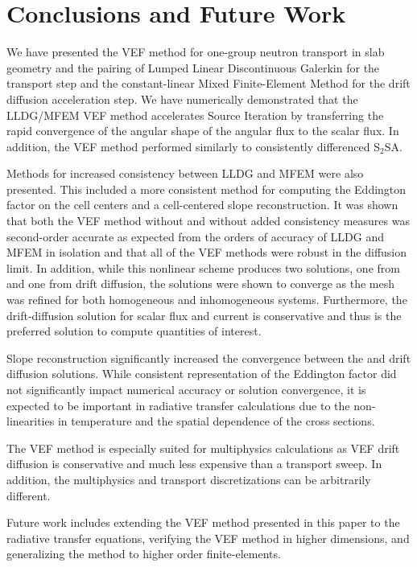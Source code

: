 
\section{Conclusions and Future Work}
We have presented the VEF method for one-group neutron transport in slab geometry and the pairing of Lumped Linear Discontinuous Galerkin for the \SN transport step and the constant-linear Mixed Finite-Element Method for the drift diffusion acceleration step. We have numerically demonstrated that the LLDG/MFEM VEF method accelerates Source Iteration by transferring the rapid convergence of the angular shape of the angular flux to the scalar flux. In addition, the VEF method performed similarly to consistently differenced S$_2$SA. 

Methods for increased consistency between LLDG and MFEM were also presented. This included a more consistent method for computing the Eddington factor on the cell centers and a cell-centered slope reconstruction. It was shown that both the VEF method without and without added consistency measures was second-order accurate as expected from the orders of accuracy of LLDG and MFEM in isolation and that all of the VEF methods were robust in the diffusion limit. In addition, while this nonlinear scheme produces two solutions, one from \SN and one from drift diffusion, the solutions were shown to converge as the mesh was refined for both homogeneous and inhomogeneous systems. Furthermore, the drift-diffusion solution for scalar flux and current is conservative and thus is the preferred solution to compute quantities of interest.    

Slope reconstruction significantly increased the convergence between the \SN and drift diffusion solutions. While consistent representation of the Eddington factor did not significantly impact numerical accuracy or solution convergence, it is expected to be important in radiative transfer calculations due to the non-linearities in temperature and the spatial dependence of the cross sections.

The VEF method is especially suited for multiphysics calculations as VEF drift diffusion is conservative and much less expensive than a transport sweep. In addition, the multiphysics and transport discretizations can be arbitrarily different. 


Future work includes extending the VEF method presented in this paper to the radiative transfer equations, verifying the VEF method in higher dimensions, and generalizing the method to higher order finite-elements. 